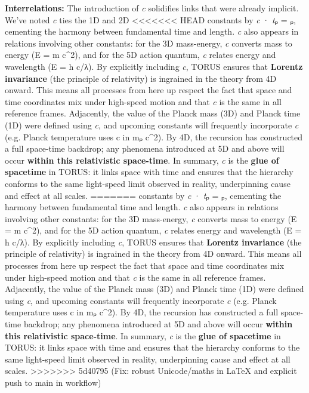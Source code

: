 \documentclass[]{article}
\begin{document}
\textbf{Interrelations:} The introduction of \emph{c} solidifies links
that were already implicit. We've noted \emph{c} ties the 1D and 2D
<<<<<<< HEAD
constants by \emph{c} · \emph{t}ₚ = \emph{\ell}ₚ\hspace{0pt}, cementing the
harmony between fundamental time and length. \emph{c} also appears in
relations involving other constants: for the 3D mass-energy, \emph{c}
converts mass to energy (E = m c\^{}2), and for the 5D action quantum,
\emph{c} relates energy and wavelength (E = h c/λ)\hspace{0pt}. By
explicitly including \emph{c}, TORUS ensures that \textbf{Lorentz
invariance} (the principle of relativity) is ingrained in the theory
from 4D onward. This means all processes from here up respect the fact
that space and time coordinates mix under high-speed motion and that
\emph{c} is the same in all reference frames. Adjacently, the value of
the Planck mass (3D) and Planck time (1D) were defined using \emph{c},
and upcoming constants will frequently incorporate \emph{c} (e.g. Planck
temperature uses c in mₚ c\^{}2). By 4D, the recursion has constructed a
full space-time backdrop; any phenomena introduced at 5D and above will
occur \textbf{within this relativistic space-time}\hspace{0pt}. In
summary, \emph{c} is the \textbf{glue of spacetime} in TORUS: it links
space with time and ensures that the hierarchy conforms to the same
light-speed limit observed in reality, underpinning cause and effect at
all scales.
=======
constants by \emph{c} · \emph{t}ₚ = \emph{\ell}ₚ​, cementing the harmony
between fundamental time and length. \emph{c} also appears in relations
involving other constants: for the 3D mass-energy, \emph{c} converts
mass to energy (E = m c\^{}2), and for the 5D action quantum, \emph{c}
relates energy and wavelength (E = h c/λ)​. By explicitly including
\emph{c}, TORUS ensures that \textbf{Lorentz invariance} (the principle
of relativity) is ingrained in the theory from 4D onward. This means all
processes from here up respect the fact that space and time coordinates
mix under high-speed motion and that \emph{c} is the same in all
reference frames. Adjacently, the value of the Planck mass (3D) and
Planck time (1D) were defined using \emph{c}, and upcoming constants
will frequently incorporate \emph{c} (e.g. Planck temperature uses c in
mₚ c\^{}2). By 4D, the recursion has constructed a full space-time
backdrop; any phenomena introduced at 5D and above will occur
\textbf{within this relativistic space-time}​. In summary, \emph{c} is
the \textbf{glue of spacetime} in TORUS: it links space with time and
ensures that the hierarchy conforms to the same light-speed limit
observed in reality, underpinning cause and effect at all scales.
>>>>>>> 5d40795 (Fix: robust Unicode/maths in LaTeX and explicit push to main in workflow)
\end{document}
